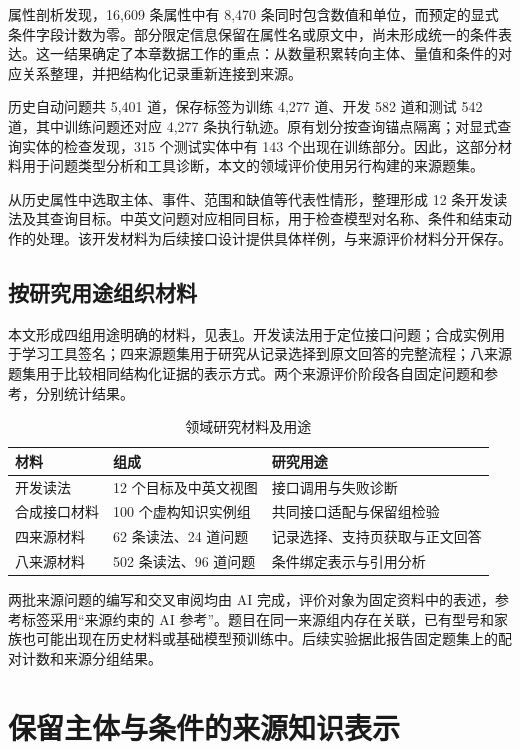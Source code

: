 属性剖析发现，16,609 条属性中有 8,470 条同时包含数值和单位，而预定的显式条件字段计数为零。部分限定信息保留在属性名或原文中，尚未形成统一的条件表达。这一结果确定了本章数据工作的重点：从数量积累转向主体、量值和条件的对应关系整理，并把结构化记录重新连接到来源。

历史自动问题共 5,401 道，保存标签为训练 4,277 道、开发 582 道和测试 542 道，其中训练问题还对应 4,277 条执行轨迹。原有划分按查询锚点隔离；对显式查询实体的检查发现，315 个测试实体中有 143 个出现在训练部分。因此，这部分材料用于问题类型分析和工具诊断，本文的领域评价使用另行构建的来源题集。

从历史属性中选取主体、事件、范围和缺值等代表性情形，整理形成 12 条开发读法及其查询目标。中英文问题对应相同目标，用于检查模型对名称、条件和结束动作的处理。该开发材料为后续接口设计提供具体样例，与来源评价材料分开保存。

\subsection{按研究用途组织材料}

本文形成四组用途明确的材料，见表\ref{tab:data-materials}。开发读法用于定位接口问题；合成实例用于学习工具签名；四来源题集用于研究从记录选择到原文回答的完整流程；八来源题集用于比较相同结构化证据的表示方式。两个来源评价阶段各自固定问题和参考，分别统计结果。

\begin{table}[htbp]
\centering\small
\caption{领域研究材料及用途}
\label{tab:data-materials}
\begin{tabular}{p{3.2cm}p{4.5cm}p{5.2cm}}
\toprule
材料 & 组成 & 研究用途 \\
\midrule
开发读法 & 12 个目标及中英文视图 & 接口调用与失败诊断 \\
合成接口材料 & 100 个虚构知识实例组 & 共同接口适配与保留组检验 \\
四来源材料 & 62 条读法、24 道问题 & 记录选择、支持页获取与正文回答 \\
八来源材料 & 502 条读法、96 道问题 & 条件绑定表示与引用分析 \\
\bottomrule
\end{tabular}
\end{table}

两批来源问题的编写和交叉审阅均由 AI 完成，评价对象为固定资料中的表述，参考标签采用“来源约束的 AI 参考”。题目在同一来源组内存在关联，已有型号和家族也可能出现在历史材料或基础模型预训练中。后续实验据此报告固定题集上的配对计数和来源分组结果。

\section{保留主体与条件的来源知识表示}


